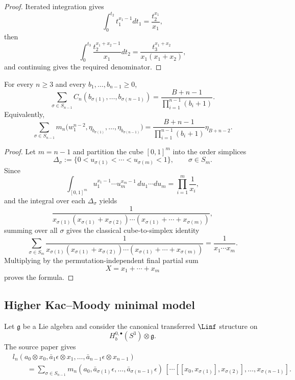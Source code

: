 \begin{proof}
Iterated integration gives
\[
\int_0^{t_2}t_1^{x_1-1}dt_1=\frac{t_2^{x_1}}{x_1},
\]
then
\[
\int_0^{t_3}\frac{t_2^{x_1+x_2-1}}{x_1}dt_2
=
\frac{t_3^{x_1+x_2}}{x_1(x_1+x_2)},
\]
and continuing gives the required denominator.
\end{proof}

\begin{theorem}
For every $n\ge3$ and every $b_1,\dots,b_{n-1}\ge0$,
\[
\sum_{\sigma\in S_{n-1}}
C_n(b_{\sigma(1)},\dots,b_{\sigma(n-1)})
=
\frac{B+n-1}{\prod_{i=1}^{n-1}(b_i+1)}.
\]
Equivalently,
\[
\sum_{\sigma\in S_{n-1}}
m_n\bigl(w_1^{n-2},\eta_{b_{\sigma(1)}},\dots,\eta_{b_{\sigma(n-1)}}\bigr)
=
\frac{B+n-1}{\prod_{i=1}^{n-1}(b_i+1)}\eta_{B+n-2}.
\]
\end{theorem}

\begin{proof}
Let $m=n-1$ and partition the cube $[0,1]^m$ into the order simplices
\[
\Delta_\sigma:=\{0<u_{\sigma(1)}<\cdots<u_{\sigma(m)}<1\},
\qquad \sigma\in S_m.
\]
Since
\[
\int_{[0,1]^m}u_1^{x_1-1}\cdots u_m^{x_m-1}\,du_1\cdots du_m
=
\prod_{i=1}^m\frac1{x_i},
\]
and the integral over each $\Delta_\sigma$ yields
\[
\frac{1}{x_{\sigma(1)}(x_{\sigma(1)}+x_{\sigma(2)})\cdots
(x_{\sigma(1)}+\cdots+x_{\sigma(m)})},
\]
summing over all $\sigma$ gives the classical cube-to-simplex identity
\[
\sum_{\sigma\in S_m}
\frac{1}{x_{\sigma(1)}(x_{\sigma(1)}+x_{\sigma(2)})\cdots
(x_{\sigma(1)}+\cdots+x_{\sigma(m)})}
=
\frac{1}{x_1\cdots x_m}.
\]
Multiplying by the permutation-independent final partial sum
\[
X=x_1+\cdots+x_m
\]
proves the formula.
\end{proof}

\subsection{Higher Kac--Moody minimal model}

Let $\mathfrak g$ be a Lie algebra and consider the canonical transferred $\Linf$ structure on
\[
H_b^{0,\bullet}(S^3)\otimes \mathfrak g.
\]
The source paper gives
\[
\begin{aligned}
&l_n(a_0\otimes x_0,\bar a_1\epsilon\otimes x_1,\dots,\bar a_{n-1}\epsilon\otimes x_{n-1})\\
&\qquad =
\sum_{\sigma\in S_{n-1}}
m_n(a_0,\bar a_{\sigma(1)}\epsilon,\dots,\bar a_{\sigma(n-1)}\epsilon)\,
[\cdots[[x_0,x_{\sigma(1)}],x_{\sigma(2)}],\dots,x_{\sigma(n-1)}].
\end{aligned}
\]

